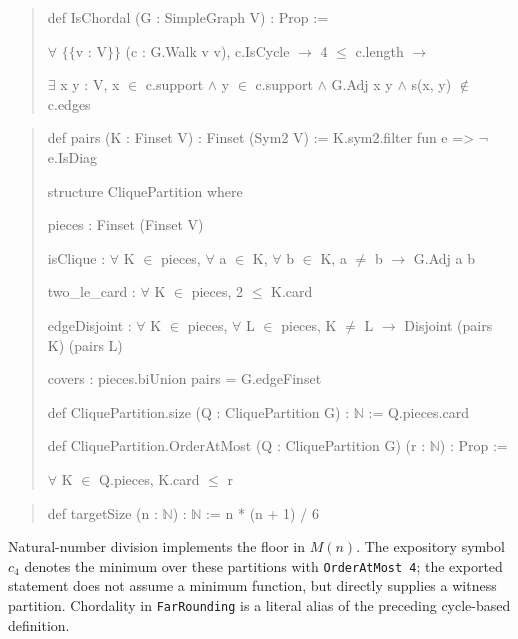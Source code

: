 \documentclass[english,11pt,a4paper]{article}
\begin{document}
\begin{quote}\footnotesize\ttfamily\raggedright
def IsChordal (G : SimpleGraph V) : Prop :=\par
  \(\forall\) \(\{\!\{\)v : V\(\}\!\}\) (c : G.Walk v v), c.IsCycle \(\to\) 4 \(\le\) c.length \(\to\)\par
    \(\exists\) x y : V, x \(\in\) c.support \(\land\) y \(\in\) c.support \(\land\) G.Adj x y \(\land\) s(x, y) \(\notin\) c.edges\par
\end{quote}

\begin{quote}\footnotesize\ttfamily\raggedright
def pairs (K : Finset V) : Finset (Sym2 V) := K.sym2.filter fun e => \(\neg\) e.IsDiag\par
\par
structure CliquePartition where\par
  pieces : Finset (Finset V)\par
  isClique : \(\forall\) K \(\in\) pieces, \(\forall\) a \(\in\) K, \(\forall\) b \(\in\) K, a \(\ne\) b \(\to\) G.Adj a b\par
  two\_le\_card : \(\forall\) K \(\in\) pieces, 2 \(\le\) K.card\par
  edgeDisjoint : \(\forall\) K \(\in\) pieces, \(\forall\) L \(\in\) pieces, K \(\ne\) L \(\to\) Disjoint (pairs K) (pairs L)\par
  covers : pieces.biUnion pairs = G.edgeFinset\par
\par
def CliquePartition.size (Q : CliquePartition G) : \(\mathbb N\) := Q.pieces.card\par
\par
def CliquePartition.OrderAtMost (Q : CliquePartition G) (r : \(\mathbb N\)) : Prop :=\par
  \(\forall\) K \(\in\) Q.pieces, K.card \(\le\) r\par
\end{quote}

\begin{quote}\footnotesize\ttfamily\raggedright
def targetSize (n : \(\mathbb N\)) : \(\mathbb N\) := n * (n + 1) / 6\par
\end{quote}

Natural-number division implements the floor in \(M(n)\). The expository symbol \(c_4\) denotes the minimum over these partitions with \texttt{OrderAtMost\ 4}; the exported statement does not assume a minimum function, but directly supplies a witness partition. Chordality in \nolinkurl{FarRounding} is a literal alias of the preceding cycle-based definition.
\end{document}
